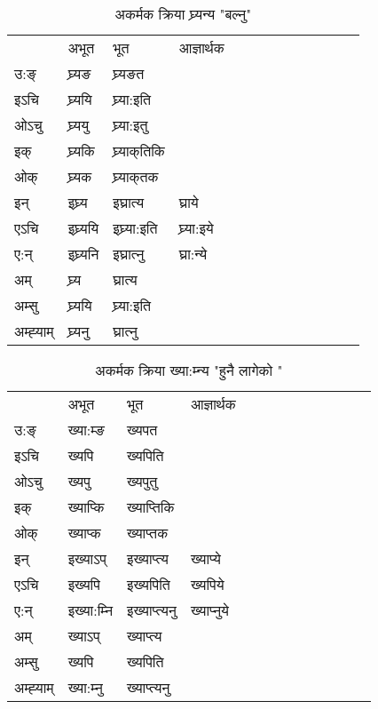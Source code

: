 

\begin{table}[H]
\centering
\caption{\label{ɛ.vi} अकर्मक क्रिया  घ्र्यन्य  "बल्नु"  }
\begin{tabular}{l|l|l|l|l|l|l|l|l|l|l|l|l}  \toprule
&अभूत & भूत & आज्ञार्थक \\ 
उ:ङ्‌ &घ्र्यङ &घ्र्यङत \\ 
इऽचि &घ्र्ययि &घ्र्या:इति   \\ 
ओऽचु &घ्र्ययु &घ्र्या:इतु   \\ 
इक् &घ्र्यकि &घ्र्याक्‌तिकि   \\ 
ओक् &घ्र्यक &घ्र्याक्‌तक   \\ 
इन् & इघ्र्य & इघ्रात्य &घ्राये  \\ 
एऽचि & इघ्र्ययि & इघ्र्या:इति &घ्र्या:इये    \\ 
ए:न् & इघ्र्यनि  & इघ्रात्‍नु &घ्रा:न्ये  \\ 
अम् & घ्र्य & घ्रात्य   \\ 
अम्सु & घ्र्ययि & घ्र्या:इति     \\ 
अम्ह्‍याम् & घ्र्यनु  & घ्रात्‍नु \\ 
\bottomrule
\end{tabular}
\end{table}


\begin{table}[H]
\centering
\caption{\label{ɛp.vi} अकर्मक क्रिया  ख्या:म्‍न्य  "हुनै लागेको "  }
\begin{tabular}{l|l|l|l|l|l|l|l|l|l|l|l|l}  \toprule
&अभूत & भूत & आज्ञार्थक \\ 
उ:ङ्‌ &ख्या:म्ङ &ख्यपत \\ 
इऽचि &ख्यपि &ख्यपिति   \\ 
ओऽचु &ख्यपु &ख्यपुतु   \\ 
इक् &ख्याप्कि &ख्याप्‍तिकि   \\ 
ओक् &ख्याप्क &ख्याप्‍तक   \\ 
इन् & इख्याऽप् & इख्याप्‍त्य &ख्याप्ये  \\ 
एऽचि & इख्यपि & इख्यपिति &ख्यपिये    \\ 
ए:न् & इख्या:म्‍नि  & इख्याप्‍त्यनु &ख्याप्‍नुये  \\ 
अम् & ख्याऽप् & ख्याप्‍त्य   \\ 
अम्सु & ख्यपि & ख्यपिति   \\ 
अम्ह्‍याम् & ख्या:म्‍नु  & ख्याप्‍त्यनु \\ 
\bottomrule
\end{tabular}
\end{table}


